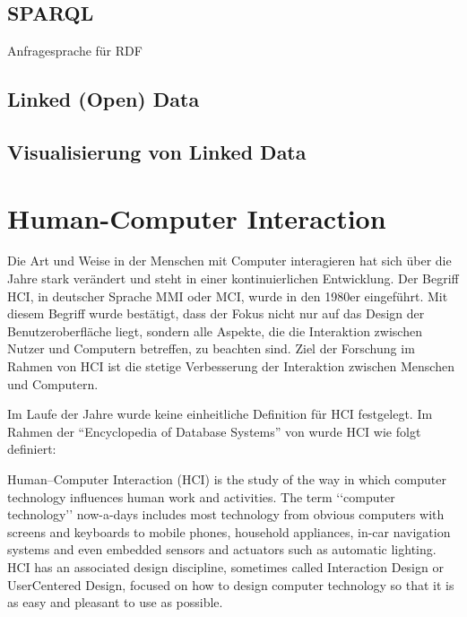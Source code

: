 \subsection{SPARQL} 

Anfragesprache für RDF

\subsection{Linked (Open) Data}

\subsection{Visualisierung von Linked Data} 

\section{Human-Computer Interaction}\label{sec:ux}

Die Art und Weise in der Menschen mit Computer interagieren hat sich über die Jahre stark verändert und steht in einer kontinuierlichen Entwicklung. 
Der Begriff  \ac{HCI}, in deutscher Sprache \ac{MMI} oder \ac{MCI}, wurde in den 1980er eingeführt.
Mit diesem Begriff wurde bestätigt, dass der Fokus nicht nur auf das Design der Benutzeroberfläche liegt, sondern alle Aspekte, die die Interaktion zwischen Nutzer und Computern betreffen, zu beachten sind. \citep[vgl.]{preece_human-computer_1995}
Ziel der Forschung im Rahmen von \ac{HCI} ist die stetige Verbesserung der Interaktion zwischen Menschen und Computern. \newline

\noindent Im Laufe der Jahre wurde keine einheitliche Definition für \ac{HCI} festgelegt.
Im Rahmen der \enquote{Encyclopedia of Database Systems} von \citet{dix_human-computer_2009} wurde \ac{HCI} wie folgt definiert:
\begin{definition}
  Human–Computer Interaction (HCI) is the study of the way in which computer technology influences human work and activities. 
  The term ‘‘computer technology’’ now-a-days includes most technology from obvious computers with screens and keyboards to mobile phones, household appliances, in-car navigation
  systems and even embedded sensors and actuators such as automatic lighting. 
  HCI has an associated design discipline, sometimes called Interaction Design or UserCentered Design, focused on how to design computer technology so that it is as easy and
  pleasant to use as possible.
\end{definition}

